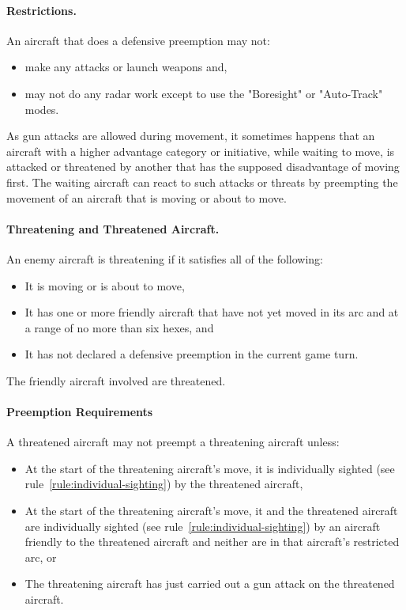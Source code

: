 {\paragraph{Restrictions.} An aircraft that does a defensive preemption may not:  

\begin{itemize}
    \item make any attacks or launch weapons and,
    \item may not do any radar work except to use the "Boresight" or "Auto-Track" modes.
\end{itemize}	
}{

As gun attacks are allowed during movement, it sometimes happens that an aircraft with a higher advantage category or initiative, while waiting to move, is attacked or threatened by another that has the supposed disadvantage of moving first. The waiting aircraft can react to such attacks or threats by preempting the movement of an aircraft that is moving or about to move.

\paragraph{Threatening and Threatened Aircraft.} An enemy aircraft is threatening if it satisfies all of the following:

\begin{itemize}
\item It is moving or is about to move,
\item It has one or more friendly aircraft that have not yet moved in its   arc and at a range of no more than six hexes, and
\item It has not declared a defensive preemption in the current game turn.
\end{itemize}
The friendly aircraft involved are threatened.

\paragraph{Preemption Requirements} A threatened aircraft may not preempt a threatening aircraft unless:
\begin{itemize}
     \item At the start of the threatening aircraft’s move, it is individually sighted (see rule~\ref{rule:individual-sighting}) by the threatened aircraft,
     \item At the start of the threatening aircraft’s move, it and the threatened aircraft are individually sighted (see rule~\ref{rule:individual-sighting}) by an aircraft friendly to the threatened aircraft and neither are in that aircraft’s restricted arc, or
     \item The threatening aircraft has just carried out a gun attack on the threatened aircraft.
\end{itemize}

}
